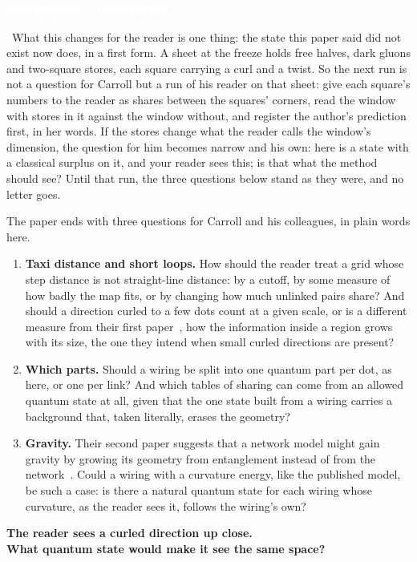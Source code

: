 \documentclass[11pt,letterpaper]{article}
\newcommand{\sub}[1]{\par\medskip{\color{ink}\large\bfseries #1}\par}
\newcommand{\tagbox}[2]{{\sffamily\scriptsize\colorbox{#1}{\textcolor{white}{\strut #2}}}}
\newcommand{\Ours}{\tagbox{kOurs}{OUR READING, UNVERIFIED}}
\begin{document}
\Ours\ What this changes for the reader is one thing: the state this paper said did not exist now does, in a
first form. A sheet at the freeze holds free halves, dark gluons and two-square stores, each square carrying a
curl and a twist. So the next run is not a question for Carroll but a run of his reader on that sheet: give each
square's numbers to the reader as shares between the squares' corners, read the window with stores in it against
the window without, and register the author's prediction first, in her words. If the stores change what the reader
calls the window's dimension, the question for him becomes narrow and his own: here is a state with a classical
surplus on it, and your reader sees this; is that what the method should see? Until that run, the three questions
below stand as they were, and no letter goes.

\sub{The questions}
The paper ends with three questions for Carroll and his colleagues, in plain words here.
\begin{enumerate}\setlength{\itemsep}{2pt}
\item \textbf{Taxi distance and short loops.} How should the reader treat a grid whose step distance is
not straight-line distance: by a cutoff, by some measure of how badly the map fits, or by changing how
much unlinked pairs share? And should a direction curled to a few dots count at a given scale, or is a
different measure from their first paper~\cite{CCM16}, how the information inside a region grows with its
size, the one they intend when small curled directions are present?
\item \textbf{Which parts.} Should a wiring be split into one quantum part per dot, as here, or one per
link? And which tables of sharing can come from an allowed quantum state at all, given that the one
state built from a wiring carries a background that, taken literally, erases the geometry?
\item \textbf{Gravity.} Their second paper suggests that a network model might gain gravity by growing
its geometry from entanglement instead of from the network~\cite{CC17}. Could a wiring with a curvature
energy, like the published model, be such a case: is there a natural quantum state for each wiring whose
curvature, as the reader sees it, follows the wiring's own?
\end{enumerate}

\begin{center}
{\color{ink}\Large\bfseries The reader sees a curled direction up close.\\What quantum state would make it see the same space?}
\end{center}
\end{document}
